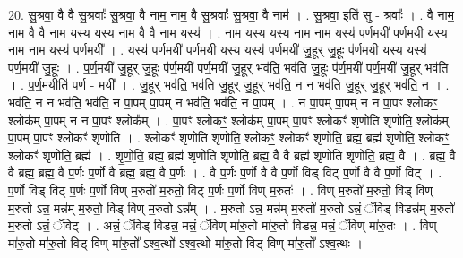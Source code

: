 \documentclass[17pt]{extarticle}
\begin{document}
20. सु॒श्रवा॒ वै वै सु॒श्रवाः᳚ सु॒श्रवा॒ वै नाम॒ नाम॒ वै सु॒श्रवाः᳚ सु॒श्रवा॒ वै नाम॑ । . सु॒श्रवा॒ इति॑ सु - श्रवाः᳚ । . वै नाम॒ नाम॒ वै वै नाम॒ यस्य॒ यस्य॒ नाम॒ वै वै नाम॒ यस्य॑ । . नाम॒ यस्य॒ यस्य॒ नाम॒ नाम॒ यस्य॑ पर्ण॒मयी॑ पर्ण॒मयी॒ यस्य॒ नाम॒ नाम॒ यस्य॑ पर्ण॒मयी᳚ । . यस्य॑ पर्ण॒मयी॑ पर्ण॒मयी॒ यस्य॒ यस्य॑ पर्ण॒मयी॑ जु॒हूर् जु॒हूः प॑र्ण॒मयी॒ यस्य॒ यस्य॑ पर्ण॒मयी॑ जु॒हूः । . प॒र्ण॒मयी॑ जु॒हूर् जु॒हूः प॑र्ण॒मयी॑ पर्ण॒मयी॑ जु॒हूर् भव॑ति॒ भव॑ति जु॒हूः प॑र्ण॒मयी॑ पर्ण॒मयी॑ जु॒हूर् भव॑ति । . प॒र्ण॒मयीति॑ पर्ण - मयी᳚ । . जु॒हूर् भव॑ति॒ भव॑ति जु॒हूर् जु॒हूर् भव॑ति॒ न न भव॑ति जु॒हूर् जु॒हूर् भव॑ति॒ न । . भव॑ति॒ न न भव॑ति॒ भव॑ति॒ न पा॒पम् पा॒पम् न भव॑ति॒ भव॑ति॒ न पा॒पम् । . न पा॒पम् पा॒पम् न न पा॒पꣳ श्लोकꣳ॒॒ श्लोक॑म् पा॒पम् न न पा॒पꣳ श्लोक᳚म् । . पा॒पꣳ श्लोकꣳ॒॒ श्लोक॑म् पा॒पम् पा॒पꣳ श्लोकꣳ॑ शृणोति शृणोति॒ श्लोक॑म् पा॒पम् पा॒पꣳ श्लोकꣳ॑ शृणोति । . श्लोकꣳ॑ शृणोति शृणोति॒ श्लोकꣳ॒॒ श्लोकꣳ॑ शृणोति॒ ब्रह्म॒ ब्रह्म॑ शृणोति॒ श्लोकꣳ॒॒ श्लोकꣳ॑ शृणोति॒ ब्रह्म॑ । . शृ॒णो॒ति॒ ब्रह्म॒ ब्रह्म॑ शृणोति शृणोति॒ ब्रह्म॒ वै वै ब्रह्म॑ शृणोति शृणोति॒ ब्रह्म॒ वै । . ब्रह्म॒ वै वै ब्रह्म॒ ब्रह्म॒ वै प॒र्णः प॒र्णो वै ब्रह्म॒ ब्रह्म॒ वै प॒र्णः । . वै प॒र्णः प॒र्णो वै वै प॒र्णो विड् विट् प॒र्णो वै वै प॒र्णो विट् । . प॒र्णो विड् विट् प॒र्णः प॒र्णो विण् म॒रुतो॑ म॒रुतो॒ विट् प॒र्णः प॒र्णो विण् म॒रुतः॑ । . विण् म॒रुतो॑ म॒रुतो॒ विड् विण् म॒रुतो ऽन्न॒ मन्न॑म् म॒रुतो॒ विड् विण् म॒रुतो ऽन्न᳚म् । . म॒रुतो ऽन्न॒ मन्न॑म् म॒रुतो॑ म॒रुतो ऽन्नं॒ ॅविड् विडन्न॑म् म॒रुतो॑ म॒रुतो ऽन्नं॒ ॅविट् । . अन्नं॒ ॅविड् विडन्न॒ मन्नं॒ ॅविण् मा॑रु॒तो मा॑रु॒तो विडन्न॒ मन्नं॒ ॅविण् मा॑रु॒तः । . विण् मा॑रु॒तो मा॑रु॒तो विड् विण् मा॑रु॒तो᳚ ऽश्व॒त्थो᳚ ऽश्व॒त्थो मा॑रु॒तो विड् विण् मा॑रु॒तो᳚ ऽश्व॒त्थः । \newline
\end{document}
